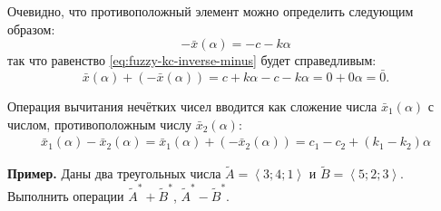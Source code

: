 Очевидно, что противоположный элемент можно определить следующим образом:
\begin{equation*}
  -\bar{x}\left( \alpha  \right)=-c-k\alpha
\end{equation*}
так что равенство \eqref{eq:fuzzy-kc-inverse-minus} будет справедливым:
\begin{equation*}
	\bar{x}\left( \alpha  \right)+\left( -\bar{x}\left( \alpha  \right) \right)=c+k\alpha -c-k\alpha =0+0\alpha =\bar{0}.
\end{equation*}

Операция вычитания нечётких чисел вводится как сложение числа $\bar{x}_1\left(\alpha \right)$ с числом, противоположным числу $\bar{x}_2\left( \alpha  \right)$:
\begin{gather*}
  \bar{x}_1\left(\alpha \right)-\bar{x}_2\left(\alpha \right)=\bar{x}_1\left(\alpha \right)+\left(-\bar{x}_2\left(\alpha \right) \right)=c_1-c_2+\left( k_1-k_2 \right)\alpha
\end{gather*}

\textbf{Пример.} Даны два треугольных числа $\tilde A=\left\langle 3;4;1 \right\rangle $ и $\tilde B=\left\langle 5;2;3 \right\rangle$. Выполнить операции $\tilde A^{*}+ \tilde B^{*}$, $\tilde A^{*}-\tilde B^{*}$.


